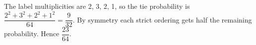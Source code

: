 The label multiplicities are 2, 3, 2, 1, so the tie probability is $\dfrac{2^2+3^2+2^2+1^2}{64}=\dfrac{9}{32}$. By symmetry each strict ordering gets half the remaining probability. Hence $\boxed{\dfrac{23}{64}}$.

